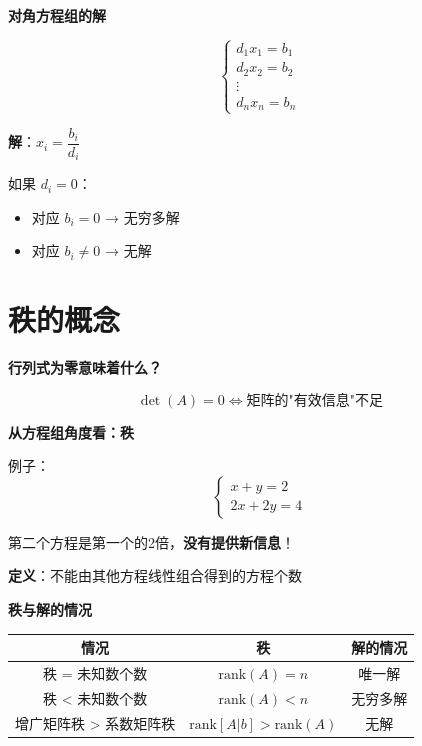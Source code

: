 \documentclass[aspectratio=169,12pt]{beamer}
\begin{document}
\begin{frame}
\fontsize{11}{13}\selectfont
\centerline{\textbf{对角方程组的解}}

\[
\begin{cases}
d_1 x_1 = b_1 \\
d_2 x_2 = b_2 \\
\vdots \\
d_n x_n = b_n
\end{cases}
\]

\pause
\bigskip
\centerline{\textbf{解}：$x_i = \dfrac{b_i}{d_i}$}

\bigskip
\pause
如果 $d_i = 0$：
\begin{itemize}
    \item 对应 $b_i = 0$ → 无穷多解
    \item 对应 $b_i \neq 0$ → 无解
\end{itemize}
\end{frame}

\section{秩的概念}

\begin{frame}
\fontsize{10}{12}\selectfont
\centerline{\textbf{行列式为零意味着什么？}}

\[
\det(A) = 0 \iff \text{矩阵的"有效信息"不足}
\]

\bigskip
\pause
\centerline{\textbf{从方程组角度看：秩}}

\bigskip
例子：
\[
\begin{cases}
x + y = 2 \\
2x + 2y = 4
\end{cases}
\]

第二个方程是第一个的2倍，\textbf{没有提供新信息}！

\pause
\bigskip
\centerline{\textbf{定义}：不能由其他方程线性组合得到的方程个数}
\end{frame}

\begin{frame}
\fontsize{10}{12}\selectfont
\centerline{\textbf{秩与解的情况}}

\begin{center}
\begin{tabular}{|c|c|c|}
\hline
情况 & 秩 & 解的情况 \\
\hline
秩 = 未知数个数 & $\text{rank}(A) = n$ & 唯一解 \\
\hline
秩 < 未知数个数 & $\text{rank}(A) < n$ & 无穷多解 \\
\hline
增广矩阵秩 > 系数矩阵秩 & $\text{rank}[A|b] > \text{rank}(A)$ & 无解 \\
\hline
\end{tabular}
\end{center}
\end{frame}
\end{document}
